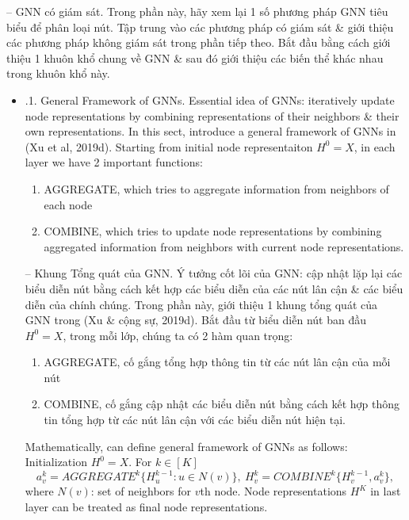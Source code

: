\documentclass{article}
\begin{document}
\begin{itemize}
\begin{itemize}
        -- {\sf GNN có giám sát.} Trong phần này, hãy xem lại 1 số phương pháp GNN tiêu biểu để phân loại nút. Tập trung vào các phương pháp có giám sát \& giới thiệu các phương pháp không giám sát trong phần tiếp theo. Bắt đầu bằng cách giới thiệu 1 khuôn khổ chung về GNN \& sau đó giới thiệu các biến thể khác nhau trong khuôn khổ này.
        \begin{itemize}
            \item {.1. General Framework of GNNs.} Essential idea of GNNs: iteratively update node representations by combining representations of their neighbors \& their own representations. In this sect, introduce a general framework of GNNs in (Xu et al, 2019d). Starting from initial node representaiton $H^0 = X$, in each layer we have 2 important functions:
            \begin{enumerate}
                \item AGGREGATE, which tries to aggregate information from neighbors of each node
                \item COMBINE, which tries to update node representations by combining aggregated information from neighbors with current node representations.
            \end{enumerate}
            -- {\sf Khung Tổng quát của GNN.} Ý tưởng cốt lõi của GNN: cập nhật lặp lại các biểu diễn nút bằng cách kết hợp các biểu diễn của các nút lân cận \& các biểu diễn của chính chúng. Trong phần này, giới thiệu 1 khung tổng quát của GNN trong (Xu \& cộng sự, 2019d). Bắt đầu từ biểu diễn nút ban đầu $H^0 = X$, trong mỗi lớp, chúng ta có 2 hàm quan trọng:
            \begin{enumerate}
                \item AGGREGATE, cố gắng tổng hợp thông tin từ các nút lân cận của mỗi nút
                \item COMBINE, cố gắng cập nhật các biểu diễn nút bằng cách kết hợp thông tin tổng hợp từ các nút lân cận với các biểu diễn nút hiện tại.
            \end{enumerate}
            Mathematically, can define general framework of GNNs as follows: Initialization $H^0 = X$. For $k\in[K]$
            \begin{equation*}
                a_v^k = AGGREGATE^k\{H_u^{k-1}:u\in N(v)\},\ H_v^k = COMBINE^k\{H_v^{k-1},a_v^k\},
            \end{equation*}
            where $N(v)$: set of neighbors for $v$th node. Node representations $H^K$ in last layer can be treated as final node representations.


\end{itemize}
\end{itemize}
\end{itemize}
\end{document}
